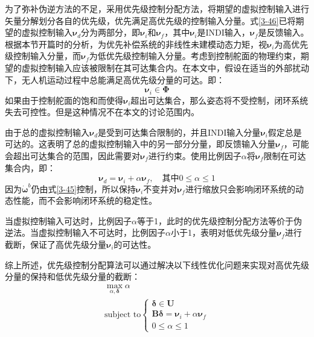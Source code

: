为了弥补伪逆方法的不足，采用优先级控制分配方法，将期望的虚拟控制输入进行矢量分解划分各自的优先级，优先满足高优先级的控制输入分量。式\eqref{3-46}已将期望的虚拟控制输入$\boldsymbol{\nu}_d$分为两部分，即$\boldsymbol{\nu}_i$和$\boldsymbol{\nu}_f$，其中$\boldsymbol{\nu}_i$是INDI输入，$\boldsymbol{\nu}_f$是反馈输入。根据本节开篇时的分析，为优先补偿系统的非线性未建模动态力矩，视$\boldsymbol{\nu}_i$为高优先级控制输入分量，而$\boldsymbol{\nu}_f$为低优先级控制输入分量。考虑到控制舵面的物理约束，期望的虚拟控制输入应该被限制在其可达集合内。在本文中，假设在适当的外部扰动下，无人机运动过程中总能满足高优先级分量的可达。即：
\begin{equation}
    \boldsymbol{\nu}_i\in\boldsymbol\Phi
    \label{3-58}
\end{equation}
如果由于控制舵面的饱和而使得$\boldsymbol{\nu}_i$超出可达集合，那么姿态将不受控制，闭环系统失去可控性。但是这种情况不在本文的讨论范围内。

由于总的虚拟控制输入$\boldsymbol{\nu}_d$是受到可达集合限制的，并且INDI输入分量$\boldsymbol{\nu}_i$假定总是可达的。这表明了总的虚拟控制输入中的另一部分分量，即反馈输入分量$\boldsymbol{\nu}_f$，可能会超出可达集合的范围，因此需要对$\boldsymbol{\nu}_f$进行约束。使用比例因子$\alpha$将$\boldsymbol{\nu}_f$限制在可达集合内，即：
\begin{equation}
    \boldsymbol{\nu}_d=\boldsymbol{\nu}_i+\alpha\boldsymbol{\nu}_f,\quad\text{其中}0\leq\alpha\leq1
    \label{3-59}
\end{equation}
因为$\dot{\boldsymbol{\omega}}^b$仍由式\eqref{3-45}控制，所以保持$\boldsymbol{\nu}_i$不变并对$\boldsymbol{\nu}_f$进行缩放只会影响闭环系统的动态性能，而不会影响闭环系统的稳定性。

当虚拟控制输入可达时，比例因子$\alpha$等于1，此时的优先级控制分配方法等价于伪逆法。当虚拟控制输入不可达时，比例因子$\alpha$小于1，表明对低优先级分量$\boldsymbol{\nu}_f$进行截断，保证了高优先级分量$\boldsymbol{\nu}_i$的可达性。

综上所述，优先级控制分配算法可以通过解决以下线性优化问题来实现对高优先级分量的保持和低优先级分量的截断：
\begin{equation}
    \begin{gathered}
        \max_{\alpha,\boldsymbol{\delta}}\alpha \\
        \text{subject  to}
        \begin{cases}
        \boldsymbol{\delta}\in\boldsymbol{U} \\
        \boldsymbol{B}\boldsymbol{\delta}=\boldsymbol{\nu}_i+\alpha\boldsymbol{\nu}_f \\
        0\leq\alpha\leq1
        \end{cases}
    \end{gathered}
    \label{3-60}
\end{equation}

